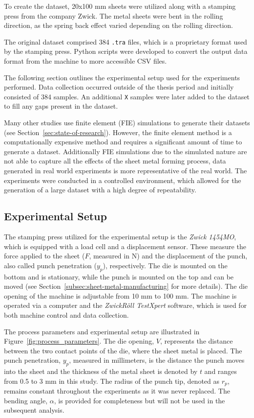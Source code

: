 To create the dataset, 20x100 mm sheets were utilized along with a stamping press from the company Zwick.
The metal sheets were bent in the rolling direction, as the spring back effect varied depending on the rolling
direction.

The original dataset comprised 384 \texttt{.tra} files, which is a proprietary format used by the stamping press.
Python scripts were developed to convert the output data format from the machine to more accessible CSV files.

The following section outlines the experimental setup used for the experiments performed.
Data collection occurred outside of the thesis period and initially consisted of 384 samples.
An additional \texttt{X} samples were later added to the dataset to fill any gaps present in the dataset.

Many other studies use finite element (FIE) simulations to generate their datasets (see
Section~\ref{sec:state-of-research}).
However, the finite element method is a computationally expensive method and requires a significant amount of time to
generate a dataset.
Additionally FIE simulations due to the simulated nature are not able to capture all the effects of the sheet metal
forming process, data generated in real world experiments is more representative of the real world.
The experiments were conducted in a controlled environment, which allowed for the generation of a large dataset
with a high degree of repeatability.

\subsection{Experimental Setup}\label{subsec:experimental-setup}
The stamping press utilized for the experimental setup is the \textit{Zwick 1454MO}, which is equipped with a load cell
and a displacement sensor.
These measure the force applied to the sheet ($F$, measured in N) and the displacement of the punch, also called
punch penetration ($y_p$), respectively.
The die is mounted on the bottom and is stationary, while the punch is mounted on the top and can be moved (see
Section~\ref{subsec:sheet-metal-manufacturing} for more details).
The die opening of the machine is adjustable from 10 mm to 100 mm.
The machine is operated via a computer and the \textit{ZwickRöll TestXpert} software, which is used for both machine
control and data collection.

The process parameters and experimental setup are illustrated in Figure~\ref{fig:process_parameters}.
The die opening, $V$, represents the distance between the two contact points of the die, where the sheet metal is
placed.
The punch penetration, $y_p$, measured in millimeters, is the distance the punch moves into the sheet and
the thickness of the metal sheet is denoted by $t$ and ranges from 0.5 to 3 mm in this study.
The radius of the punch tip, denoted as $r_p$, remains constant throughout the experiments as it was never replaced.
The bending angle, $\alpha$, is provided for completeness but will not be used in the subsequent analysis.

